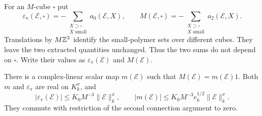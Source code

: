 For an $M$-cube $\square$ put
\begin{equation}\label{eq:rg-counterterm-maps}
 \varepsilon_{\mathrm v}(\mathscr E,\square)
          =-\sum_{\substack{X\supset\square\\X\text{ small}}}
                                                     a_0(\mathscr E,X),
 \qquad
 M(\mathscr E,\square)
          =-\sum_{\substack{X\supset\square\\X\text{ small}}}
                                                     a_2(\mathscr E,X).
\end{equation}
Translations by $M\mathbb Z^3$ identify the small-polymer sets over
different cubes. They leave the two extracted quantities
unchanged. Thus the two sums do not depend on $\square$.
Write their values as $\varepsilon_{\mathrm v}(\mathscr E)$ and
$M(\mathscr E)$.

\begin{proposition}\label{prop:rg-scalar-counterterms}
There is a complex-linear scalar map $m(\mathscr E)$ such that
$M(\mathscr E)=m(\mathscr E)1$. Both $m$ and
$\varepsilon_{\mathrm v}$ are real on $K_k^x$, and
\begin{equation}\label{eq:rg-counterterm-bounds}
 |\varepsilon_{\mathrm v}(\mathscr E)|
                  \le K_0M^{-3}\|\mathscr E\|_k^x,
 \qquad
 |m(\mathscr E)|\le K_0M^{-3}e_k^{1/2}\|\mathscr E\|_k^x.
\end{equation}
They commute with restriction of the second connection argument
to zero.
\end{proposition}

